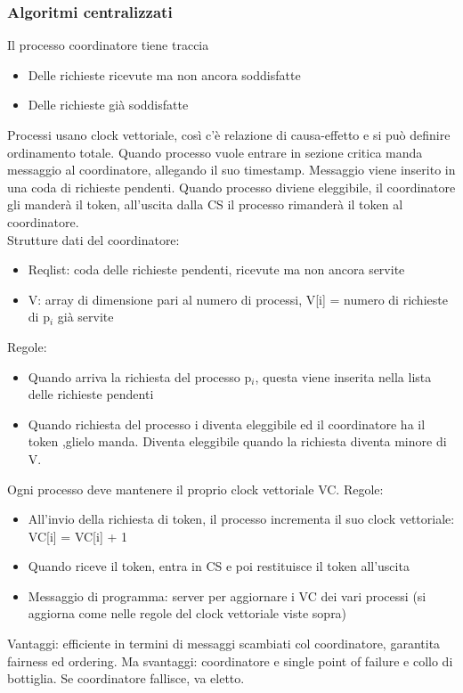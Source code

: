 \documentclass{article}
\begin{document}
\subsubsection{Algoritmi centralizzati}
Il processo coordinatore tiene traccia
\begin{itemize}
\item Delle richieste ricevute ma non ancora soddisfatte
\item Delle richieste già soddisfatte
\end{itemize}
Processi usano clock vettoriale, così c'è relazione di causa-effetto e si può definire ordinamento totale. Quando processo vuole entrare in sezione critica manda messaggio al coordinatore, allegando il suo timestamp. Messaggio viene inserito in una coda di richieste pendenti. Quando processo diviene eleggibile, il coordinatore gli manderà il token, all'uscita dalla CS il processo rimanderà il token al coordinatore.\\ Strutture dati del coordinatore:
\begin{itemize}
\item Reqlist: coda delle richieste pendenti, ricevute ma non ancora servite
\item V: array di dimensione pari al numero di processi, V[i] = numero di richieste di p$_i$ già servite 
\end{itemize}
Regole:
\begin{itemize}
\item Quando arriva la richiesta del processo p$_i$, questa viene inserita nella lista delle richieste pendenti
\item Quando richiesta del processo i diventa eleggibile ed il coordinatore ha il token ,glielo manda. Diventa eleggibile quando la richiesta diventa minore di V.
\end{itemize}
Ogni processo deve mantenere il proprio clock vettoriale VC. Regole:
\begin{itemize}
\item All'invio della richiesta di token, il processo incrementa il suo clock vettoriale: VC[i] = VC[i] + 1
\item Quando riceve il token, entra in CS e poi restituisce il token all'uscita
\item Messaggio di programma: server per aggiornare i VC dei vari processi (si aggiorna come nelle regole del clock vettoriale viste sopra)
\end{itemize}
Vantaggi: efficiente in termini di messaggi scambiati col coordinatore, garantita fairness ed ordering. Ma svantaggi: coordinatore e single point of failure e collo di bottiglia. Se coordinatore fallisce, va eletto.
\end{document}
